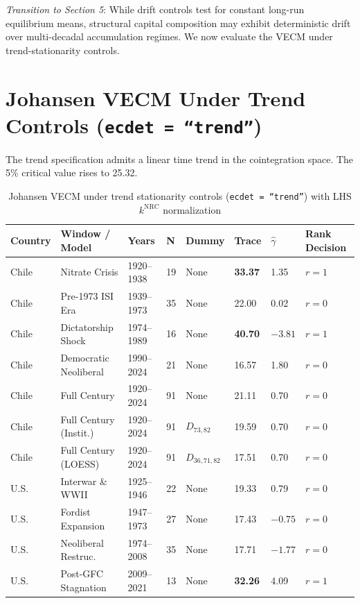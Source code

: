 \documentclass[11pt,a4paper]{article}
\begin{document}
\textit{Transition to Section 5}: While drift controls test for constant long-run equilibrium means, structural capital composition may exhibit deterministic drift over multi-decadal accumulation regimes. We now evaluate the VECM under trend-stationarity controls.

\FloatBarrier
\section{Johansen VECM Under Trend Controls (\texttt{ecdet = ``trend''})}

The trend specification admits a linear time trend in the cointegration space. The 5\% critical value rises to 25.32.

\begin{table}[h!]
\centering
\small
\caption{Johansen VECM under trend stationarity controls (\texttt{ecdet = ``trend''}) with LHS $k^{\text{NRC}}$ normalization}
\label{tab:vecm_trend_ledger}
\begin{tabular}{p{1.4cm} p{3.4cm} p{1.6cm} p{0.6cm} p{1.6cm} p{1.2cm} p{1.2cm} p{2.8cm}}
\toprule
\textbf{Country} & \textbf{Window / Model} & \textbf{Years} & \textbf{N} & \textbf{Dummy} & \textbf{Trace} & \textbf{$\hat{\gamma}$} & \textbf{Rank Decision} \\
\midrule
Chile & Nitrate Crisis & 1920--1938 & 19 & None & \textbf{33.37} & 1.35 & \textbf{$r=1$} \\
Chile & Pre-1973 ISI Era & 1939--1973 & 35 & None & 22.00 & 0.02 & $r=0$ \\
Chile & Dictatorship Shock & 1974--1989 & 16 & None & \textbf{40.70} & $-3.81$ & \textbf{$r=1$} \\
Chile & Democratic Neoliberal & 1990--2024 & 21 & None & 16.57 & 1.80 & $r=0$ \\
Chile & Full Century & 1920--2024 & 91 & None & 21.11 & 0.70 & $r=0$ \\
Chile & Full Century (Instit.) & 1920--2024 & 91 & $D_{73,82}$ & 19.59 & 0.70 & $r=0$ \\
Chile & Full Century (LOESS) & 1920--2024 & 91 & $D_{36,71,82}$ & 17.51 & 0.70 & $r=0$ \\
\midrule
U.S. & Interwar \& WWII & 1925--1946 & 22 & None & 19.33 & 0.79 & $r=0$ \\
U.S. & Fordist Expansion & 1947--1973 & 27 & None & 17.43 & $-0.75$ & $r=0$ \\
U.S. & Neoliberal Restruc. & 1974--2008 & 35 & None & 17.71 & $-1.77$ & $r=0$ \\
U.S. & Post-GFC Stagnation & 2009--2021 & 13 & None & \textbf{32.26} & 4.09 & \textbf{$r=1$} \\

\end{tabular}
\end{table}
\end{document}
